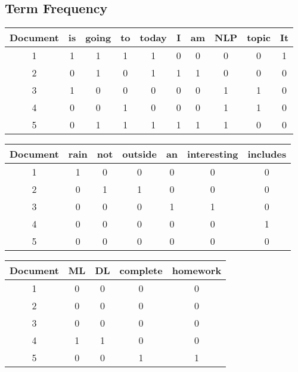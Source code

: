 \subsection{Term Frequency}
\begin{center}
{\small
\begin{tabular}{|| c ||c c c c c c c c c ||} 
\hline
Document&is&going&to&today&I&am&NLP&topic&It\\
\hline
\hline
1&1&1&1&1&0&0&0&0&1\\
2&0&1&0&1&1&1&0&0&0\\
3&1&0&0&0&0&0&1&1&0\\
4&0&0&1&0&0&0&1&1&0\\
5&0&1&1&1&1&1&1&0&0\\
\hline
\end{tabular}

\begin{tabular}{|| c|| c c c c c c ||}
\hline
Document &rain &not &outside &an &interesting &	includes  \\
\hline
\hline
1&1&0&0&0&0&0\\
2&0&1&1&0&0&0\\
3&0&0&0&1&1&0\\
4&0&0&0&0&0&1\\
5&0&0&0&0&0&0\\
\hline
\end{tabular}

\begin{tabular}{|| c|| c c c c ||}
\hline
Document &ML&DL &complete &homework\\
\hline
\hline
1&0&0&0&0\\
2&0&0&0&0\\
3&0&0&0&0\\
4&1&1&0&0\\
5&0&0&1&1\\
\hline
\end{tabular}
}
\end{center}
